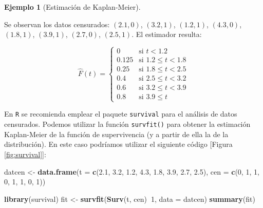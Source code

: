 \documentclass[
]{book}
\newenvironment{Shaded}{\begin{snugshade}}{\end{snugshade}}
\newcommand{\DataTypeTok}[1]{\textcolor[rgb]{0.13,0.29,0.53}{#1}}
\newcommand{\DecValTok}[1]{\textcolor[rgb]{0.00,0.00,0.81}{#1}}
\newcommand{\FloatTok}[1]{\textcolor[rgb]{0.00,0.00,0.81}{#1}}
\newcommand{\KeywordTok}[1]{\textcolor[rgb]{0.13,0.29,0.53}{\textbf{#1}}}
\newcommand{\NormalTok}[1]{#1}
\newcommand{\OperatorTok}[1]{\textcolor[rgb]{0.81,0.36,0.00}{\textbf{#1}}}
\newcommand{\StringTok}[1]{\textcolor[rgb]{0.31,0.60,0.02}{#1}}
\theoremstyle{break}
\theoremstyle{definition}
\theoremstyle{definition}
\newtheorem{example}{Ejemplo}[chapter]
\theoremstyle{definition}
\theoremstyle{remark}
\begin{document}
\begin{example}[Estimación de Kaplan-Meier]
\protect\hypertarget{exm:kaplan-meier}{}{\label{exm:kaplan-meier} \iffalse (Estimación de Kaplan-Meier) \fi{} }
\vspace{0.5cm}

Se observan los datos censurados: \(\left( 2.1,0 \right)\),
\(\left(3.2,1 \right)\), \(\left( 1.2,1 \right)\), \(\left( 4.3,0 \right)\), \(\left( 1.8,1 \right)\), \(\left( 3.9,1 \right)\), \(\left( 2.7,0 \right)\), \(\left( 2.5,1 \right)\). El estimador resulta:

\[\hat{F}\left( t \right) =\left\{ 
\begin{array}{ll}
0& \text{si } t<1.2 \\ 
0.125& \text{si } 1.2\leq t<1.8 \\ 
0.25& \text{si } 1.8\leq t<2.5 \\ 
0.4& \text{si } 2.5\leq t<3.2 \\ 
0.6& \text{si } 3.2\leq t<3.9 \\ 
0.8& \text{si } 3.9\leq t
\end{array}
\right.\]
\end{example}

En \texttt{R} se recomienda emplear el paquete \texttt{survival} para el análisis de
datos censurados. Podemos utilizar la función \texttt{survfit()} para obtener
la estimación Kaplan-Meier de la función de supervivencia
(y a partir de ella la de la distribución).
En este caso podríamos utilizar el siguiente código {[}Figura \ref{fig:survival}{]}:

\begin{Shaded}
\begin{Highlighting}[]
\NormalTok{datcen <-}\StringTok{ }\KeywordTok{data.frame}\NormalTok{(}\DataTypeTok{t =} \KeywordTok{c}\NormalTok{(}\FloatTok{2.1}\NormalTok{, }\FloatTok{3.2}\NormalTok{, }\FloatTok{1.2}\NormalTok{, }\FloatTok{4.3}\NormalTok{, }\FloatTok{1.8}\NormalTok{, }\FloatTok{3.9}\NormalTok{, }\FloatTok{2.7}\NormalTok{, }\FloatTok{2.5}\NormalTok{), }
                 \DataTypeTok{cen =} \KeywordTok{c}\NormalTok{(}\DecValTok{0}\NormalTok{, }\DecValTok{1}\NormalTok{, }\DecValTok{1}\NormalTok{, }\DecValTok{0}\NormalTok{, }\DecValTok{1}\NormalTok{, }\DecValTok{1}\NormalTok{, }\DecValTok{0}\NormalTok{, }\DecValTok{1}\NormalTok{))}

\KeywordTok{library}\NormalTok{(survival)}
\NormalTok{fit <-}\StringTok{ }\KeywordTok{survfit}\NormalTok{(}\KeywordTok{Surv}\NormalTok{(t, cen)}\OperatorTok{~}\DecValTok{1}\NormalTok{, }\DataTypeTok{data =}\NormalTok{ datcen)}
\KeywordTok{summary}\NormalTok{(fit)}
\end{Highlighting}
\end{Shaded}
\end{document}
